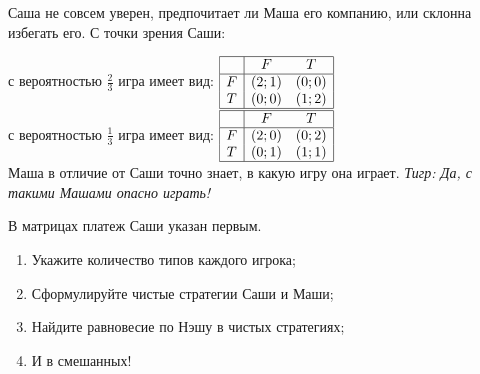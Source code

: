 \begin{problem}

Саша не совсем уверен, предпочитает ли Маша его компанию, или склонна избегать его. С точки зрения Саши:

с вероятностью  $\frac{2}{3} $  игра имеет вид:  $\begin{array}{|c|cc|}  \hline {} & {F} & {T} \\  \hline {F} & {\left(2;1\right)} & {\left(0;0\right)} \\ {T} & {\left(0;0\right)} & {\left(1;2\right)} \\  \hline  \end{array}$ \\
с вероятностью  $\frac{1}{3} $  игра имеет вид:  $\begin{array}{|c|cc|}  \hline {} & {F} & {T} \\  \hline {F} & {\left(2;0\right)} & {\left(0;2\right)} \\ {T} & {\left(0;1\right)} & {\left(1;1\right)} \\  \hline  \end{array}$ \\
Маша в отличие от Саши точно знает, в какую игру она играет.
{\it Тигр:  Да, с такими Машами опасно играть!}\par
В матрицах платеж Саши указан первым.\par
\begin{enumerate}
\item	Укажите количество типов каждого игрока;\par
\item 	Сформулируйте чистые стратегии Саши и Маши;\par
\item 	Найдите равновесие по Нэшу в чистых стратегиях;\par
\item 	И в смешанных!\par
\end{enumerate}


\begin{sol}

\end{sol}
\end{problem}



